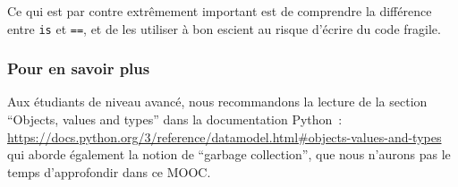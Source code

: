Ce qui est par contre extrêmement important est de comprendre la
différence entre \texttt{is} et \texttt{==}, et de les utiliser à bon
escient au risque d'écrire du code fragile.

    \hypertarget{pour-en-savoir-plus}{%
\subsubsection{Pour en savoir plus}\label{pour-en-savoir-plus}}

    Aux étudiants de niveau avancé, nous recommandons la lecture de la
section ``Objects, values and types'' dans la documentation Python~:\\

\href{https://docs.python.org/3/reference/datamodel.html\#objects-values-and-types}{https://docs.python.org/3/reference/datamodel.html\#objects-values-and-types}\\

qui aborde également la notion de ``garbage collection'', que nous
n'aurons pas le temps d'approfondir dans ce MOOC.